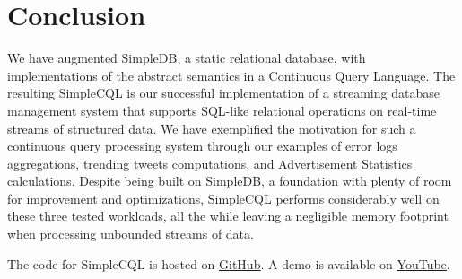 \documentclass[a4paper, 10pt, conference]{IEEEconf}
\begin{document}
\section{Conclusion}
We have augmented SimpleDB, a static relational database, with implementations of the abstract semantics in a Continuous Query Language. The resulting SimpleCQL is our successful implementation of a streaming database management system that supports SQL-like relational operations on real-time streams of structured data. We have exemplified the motivation for such a continuous query processing system through our examples of error logs aggregations, trending tweets computations, and Advertisement Statistics calculations. Despite being built on SimpleDB, a foundation with plenty of room for improvement and optimizations, SimpleCQL performs considerably well on these three tested workloads, all the while leaving a negligible memory footprint when processing unbounded streams of data.

The code for SimpleCQL is hosted on \href{https://github.com/jtwarren/simple_cql}{\underline{GitHub}}.
A demo is available on \href{https://www.youtube.com/watch?v=6b7C-D5wxIg}{\underline{YouTube}}.




\end{document}
